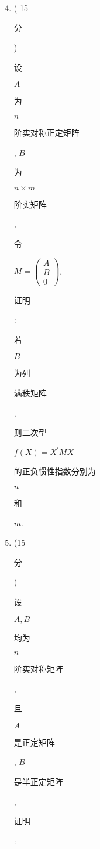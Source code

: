 \documentclass[10pt]{article}
\begin{document}
\begin{enumerate}
  \setcounter{enumi}{3}
  \item ( 15 \begin{CJK}{UTF8}{mj}分\end{CJK}) \begin{CJK}{UTF8}{mj}设\end{CJK} $A$ \begin{CJK}{UTF8}{mj}为\end{CJK} $n$ \begin{CJK}{UTF8}{mj}阶实对称正定矩阵\end{CJK}, $B$ \begin{CJK}{UTF8}{mj}为\end{CJK} $n \times m$ \begin{CJK}{UTF8}{mj}阶实矩阵\end{CJK}, \begin{CJK}{UTF8}{mj}令\end{CJK} $M=\left(\begin{array}{c}A \\ B \\ 0\end{array}\right)$, \begin{CJK}{UTF8}{mj}证明\end{CJK}: \begin{CJK}{UTF8}{mj}若\end{CJK} $B$ \begin{CJK}{UTF8}{mj}为列\end{CJK} \begin{CJK}{UTF8}{mj}满秩矩阵\end{CJK}, \begin{CJK}{UTF8}{mj}则二次型\end{CJK} $f(X)=X^{\prime} M X$ \begin{CJK}{UTF8}{mj}的正负惯性指数分别为\end{CJK} $n$ \begin{CJK}{UTF8}{mj}和\end{CJK} $m$.

  \item (15 \begin{CJK}{UTF8}{mj}分\end{CJK}) \begin{CJK}{UTF8}{mj}设\end{CJK} $A, B$ \begin{CJK}{UTF8}{mj}均为\end{CJK} $n$ \begin{CJK}{UTF8}{mj}阶实对称矩阵\end{CJK}, \begin{CJK}{UTF8}{mj}且\end{CJK} $A$ \begin{CJK}{UTF8}{mj}是正定矩阵\end{CJK}, $B$ \begin{CJK}{UTF8}{mj}是半正定矩阵\end{CJK}, \begin{CJK}{UTF8}{mj}证明\end{CJK}:

\end{enumerate}
\end{document}
